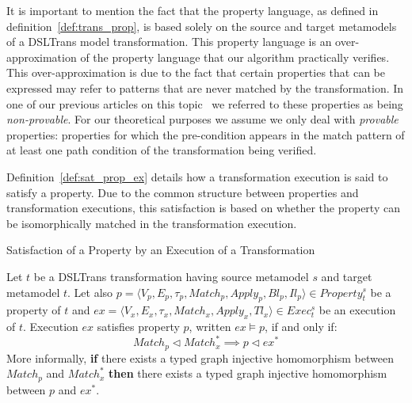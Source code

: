 It is important to mention the fact that the property language, as defined
in definition~\ref{def:trans_prop}, is based solely on the source and target metamodels of
a DSLTrans model transformation. This property language is an over-approximation
of the property language that our algorithm practically verifies. This
over-approximation is due to the fact that certain properties that can be
expressed may refer to patterns that are never matched by the transformation. In
one of our previous articles on this topic~\cite{Lucio:10} we referred to these
properties as being \emph{non-provable}.
For our theoretical purposes we assume we only deal with \emph{provable} properties:
properties for which the pre-condition appears in the match pattern of at least
one path condition of the transformation being verified.


Definition~\ref{def:sat_prop_ex} details how a transformation execution is said to satisfy a property. Due to the common structure between properties and transformation executions, this satisfaction is based on whether the property can be isomorphically matched in the transformation execution.

\begin{definition}{Satisfaction of a Property by an Execution of a Transformation}
\label{def:sat_prop_ex}

Let $t$ be a DSLTrans transformation having source metamodel $s$ and target
metamodel $t$. Let also $p = \langle
V_p,E_p,\tau_p,Match_p,Apply_p,Bl_p,Il_p\rangle \in Property^{s}_{t}$ be a
property of $t$ and $ex = \langle V_x,E_x,\tau_x,Match_x,Apply_x,Tl_x\rangle \in
Exec^{s}_{t}$ be an execution of $t$. Execution $ex$ satisfies property $p$,
written $ex \models p$, if and only if:
$$Match_p \vartriangleleft Match^{*}_{x} \implies p \vartriangleleft ex^*$$
More informally, \textbf{if} there exists a typed graph
injective homomorphism between $Match_p$ and $Match^{*}_{x}$ \textbf{then} there
exists a typed graph injective homomorphism between $p$ and $ex^*$.
\end{definition}

